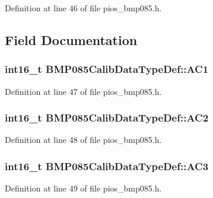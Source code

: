 \-Definition at line 46 of file pios\-\_\-bmp085.\-h.



\subsection{\-Field \-Documentation}
\hypertarget{struct_b_m_p085_calib_data_type_def_a161f72fdd77f428497ee05b818064f40}{
\subsubsection[{\-A\-C1}]{\setlength{\rightskip}{0pt plus 5cm}int16\-\_\-t {\bf \-B\-M\-P085\-Calib\-Data\-Type\-Def\-::\-A\-C1}}}\label{struct_b_m_p085_calib_data_type_def_a161f72fdd77f428497ee05b818064f40}


\-Definition at line 47 of file pios\-\_\-bmp085.\-h.

\hypertarget{struct_b_m_p085_calib_data_type_def_ac4f5e67f3bb8b7302d1394e3e0fa60fa}{
\subsubsection[{\-A\-C2}]{\setlength{\rightskip}{0pt plus 5cm}int16\-\_\-t {\bf \-B\-M\-P085\-Calib\-Data\-Type\-Def\-::\-A\-C2}}}\label{struct_b_m_p085_calib_data_type_def_ac4f5e67f3bb8b7302d1394e3e0fa60fa}


\-Definition at line 48 of file pios\-\_\-bmp085.\-h.

\hypertarget{struct_b_m_p085_calib_data_type_def_a482f54f54d2adcb6e34ec46f9ad621e0}{
\subsubsection[{\-A\-C3}]{\setlength{\rightskip}{0pt plus 5cm}int16\-\_\-t {\bf \-B\-M\-P085\-Calib\-Data\-Type\-Def\-::\-A\-C3}}}\label{struct_b_m_p085_calib_data_type_def_a482f54f54d2adcb6e34ec46f9ad621e0}


\-Definition at line 49 of file pios\-\_\-bmp085.\-h.

